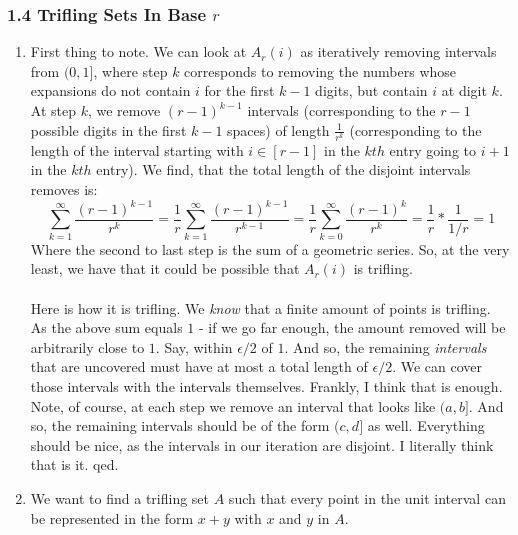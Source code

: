 \documentclass[12pt,a4paper]{article}
\newcommand{\1}[1]{\mathbbm{1}\left\{ #1 \right\}}
\begin{document}
\subsubsection{1.4 Trifling Sets In Base $r$}
\begin{enumerate}
	\item First thing to note. We can look at $A_r(i)$ as iteratively removing intervals from $(0,1]$, where step $k$ corresponds to removing the numbers whose expansions do not contain $i$ for the first $k - 1$ digits, but contain $i$ at digit $k$. At step $k$, we remove $(r-1)^{k-1}$ intervals (corresponding to the $r-1$ possible digits in the first $k-1$ spaces) of length $\frac{1}{r^k}$ (corresponding to the length of the interval starting with $i \in [r-1]$ in the $kth$ entry going to $i + 1$ in the $kth$ entry). We find, that the total length of the disjoint intervals removes is:
	$$
		\sum_{k=1}^\infty \frac{(r-1)^{k-1}}{r^k} = \frac{1}{r} \sum_{k=1}^\infty \frac{(r-1)^{k-1}}{r^{k-1}} =
		\frac{1}{r} \sum_{k=0}^\infty \frac{(r-1)^k}{r^k} = \frac{1}{r} * \frac{1}{1/r} = 1
	$$
	Where the second to last step is the sum of a geometric series. So, at the very least, we have that it could be possible that $A_r(i)$ is trifling.
	\\\\
	Here is how it is trifling. We \textit{know} that a finite amount of points is trifling. As the above sum equals $1$ - if we go far enough, the amount removed will be arbitrarily close to $1$. Say, within $\epsilon/2$ of $1$. And so, the remaining \textit{intervals} that are uncovered must have at most a total length of $\epsilon/2$. We can cover those intervals with the intervals themselves. Frankly, I think that is enough. Note, of course, at each step we remove an interval that looks like $(a,b]$. And so, the remaining intervals should be of the form $(c,d]$ as well. Everything should be nice, as the intervals in our iteration are disjoint. I literally think that is it. qed.
	
	\item We want to find a trifling set $A$ such that every point in the unit interval can be represented in the form $x + y$ with $x$ and $y$ in $A$.
	

\end{enumerate}
\end{document}
